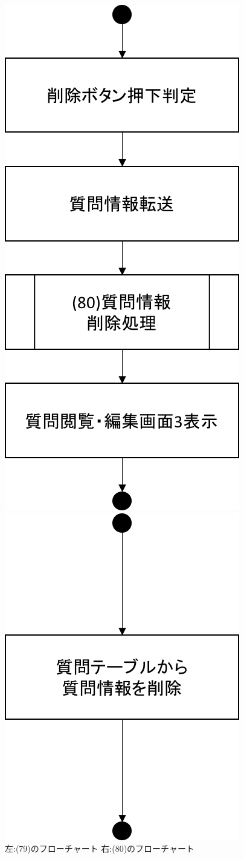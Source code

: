 \begin{figure}[htbp]
 \begin{minipage}{0.5\hsize}
  \begin{center}
   \includegraphics[width=0.5\linewidth,clip]{./img/flow/79.png}
  \end{center}
 \end{minipage}
 \begin{minipage}{0.5\hsize}
  \begin{center}
   \includegraphics[width=0.5\linewidth,clip]{./img/flow/80.png}
  \end{center}
 \end{minipage}
 \caption{左:(79)のフローチャート 右:(80)のフローチャート}\label{fig:79to80}
\end{figure}
